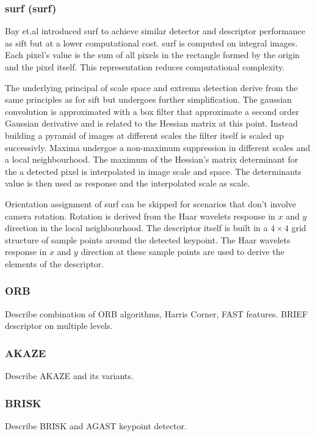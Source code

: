 \subsubsection{\acrshort{surf} (\acrlong{surf})}

Bay et.al introduced \acrshort{surf}\cite{bay_eccv06} to achieve similar detector and descriptor performance as \acrshort{sift} but at a lower computational cost.
\acrshort{surf} is computed on integral images\cite{viola_cvpr01}.
Each pixel's value is the sum of all pixels in the rectangle formed by the origin and the pixel itself.
This representation reduces computational complexity.

The underlying principal of scale space and extrema detection derive from the same principles as for \acrshort{sift} but undergoes further simplification.
The gaussian convolution is approximated with a box filter that approximate a second order Gaussian derivative and is related to the Hessian matrix at this point.
Instead building a pyramid of images at different scales the filter itself is scaled up successivly.
Maxima undergoe a non-maximum suppression in different scales and a local neighbourhood.
The maximum of the Hessian's matrix determinant for the a detected pixel is interpolated in image scale and space.
The determinants value is then used as response and the interpolated scale as scale.

Orientation assignment of \acrshort{surf} can be skipped for scenarios that don't involve camera rotation.
Rotation is derived from the Haar wavelets response in $x$ and $y$ direction in the local neighbourhood.
The descriptor itself is built in a $4\times4$ grid structure of sample points around the detected keypoint.
The Haar wavelets response in $x$ and $y$ direction at these sample points are used to derive the elements of the descriptor.

\subsubsection{ORB}

Describe combination of ORB algorithms, Harris Corner, FAST features.
BRIEF descriptor on multiple levels.

\subsubsection{AKAZE}

Describe AKAZE and its variants.

\subsubsection{BRISK}

Describe BRISK and AGAST keypoint detector.
